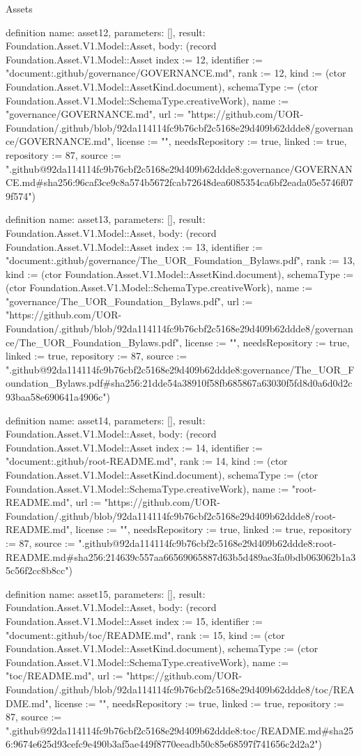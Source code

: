 \begin{lexlean}{Assets}
\begin{semanticmodule}
definition{
  name: asset12,
  parameters: [],
  result: Foundation.Asset.V1.Model::Asset,
  body: (record Foundation.Asset.V1.Model::Asset {index := 12, identifier := "document:.github/governance/GOVERNANCE.md", rank := 12, kind := (ctor Foundation.Asset.V1.Model::AssetKind.document), schemaType := (ctor Foundation.Asset.V1.Model::SchemaType.creativeWork), name := "governance/GOVERNANCE.md", url := "https://github.com/UOR-Foundation/.github/blob/92da114114fc9b76cbf2c5168e29d409b62ddde8/governance/GOVERNANCE.md", license := "", needsRepository := true, linked := true, repository := 87, source := ".github@92da114114fc9b76cbf2c5168e29d409b62ddde8:governance/GOVERNANCE.md#sha256:96caf3ce9c8a574b5672fcab72648dea6085354ca6bf2eada05e5746f079f574"})
}

definition{
  name: asset13,
  parameters: [],
  result: Foundation.Asset.V1.Model::Asset,
  body: (record Foundation.Asset.V1.Model::Asset {index := 13, identifier := "document:.github/governance/The_UOR_Foundation_Bylaws.pdf", rank := 13, kind := (ctor Foundation.Asset.V1.Model::AssetKind.document), schemaType := (ctor Foundation.Asset.V1.Model::SchemaType.creativeWork), name := "governance/The_UOR_Foundation_Bylaws.pdf", url := "https://github.com/UOR-Foundation/.github/blob/92da114114fc9b76cbf2c5168e29d409b62ddde8/governance/The_UOR_Foundation_Bylaws.pdf", license := "", needsRepository := true, linked := true, repository := 87, source := ".github@92da114114fc9b76cbf2c5168e29d409b62ddde8:governance/The_UOR_Foundation_Bylaws.pdf#sha256:21dde54a38910f58fb685867a63030f5fd8d0a6d0d2c93baa58e690641a4906c"})
}

definition{
  name: asset14,
  parameters: [],
  result: Foundation.Asset.V1.Model::Asset,
  body: (record Foundation.Asset.V1.Model::Asset {index := 14, identifier := "document:.github/root-README.md", rank := 14, kind := (ctor Foundation.Asset.V1.Model::AssetKind.document), schemaType := (ctor Foundation.Asset.V1.Model::SchemaType.creativeWork), name := "root-README.md", url := "https://github.com/UOR-Foundation/.github/blob/92da114114fc9b76cbf2c5168e29d409b62ddde8/root-README.md", license := "", needsRepository := true, linked := true, repository := 87, source := ".github@92da114114fc9b76cbf2c5168e29d409b62ddde8:root-README.md#sha256:214639c557aa66569065887d63b5d489ae3fa0bdb063062b1a35c56f2cc8b8cc"})
}

definition{
  name: asset15,
  parameters: [],
  result: Foundation.Asset.V1.Model::Asset,
  body: (record Foundation.Asset.V1.Model::Asset {index := 15, identifier := "document:.github/toc/README.md", rank := 15, kind := (ctor Foundation.Asset.V1.Model::AssetKind.document), schemaType := (ctor Foundation.Asset.V1.Model::SchemaType.creativeWork), name := "toc/README.md", url := "https://github.com/UOR-Foundation/.github/blob/92da114114fc9b76cbf2c5168e29d409b62ddde8/toc/README.md", license := "", needsRepository := true, linked := true, repository := 87, source := ".github@92da114114fc9b76cbf2c5168e29d409b62ddde8:toc/README.md#sha256:9674e625d93cefc9e490b3af5ae449f8770eeadb50c85e68597f741656c2d2a2"})
}


\end{semanticmodule}
\end{lexlean}

